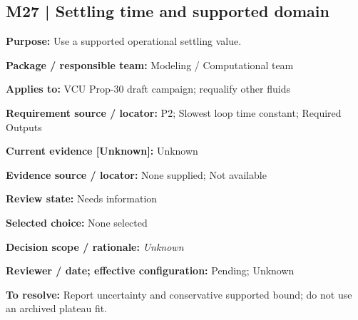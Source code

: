 \documentclass[11pt]{article}
\begin{document}
\par\noindent\begin{minipage}{\textwidth}\small\setlength{\parskip}{2pt}
\subsection*{M27 | Settling time and supported domain}
\textbf{Purpose:} Use a supported operational settling value.\par
\textbf{Package / responsible team:} Modeling / Computational team\par
\textbf{Applies to:} VCU Prop-30 draft campaign; requalify other fluids\par
\textbf{Requirement source / locator:} P2; Slowest loop time constant; Required Outputs\par
\textbf{Current evidence [Unknown]:} Unknown\par
\textbf{Evidence source / locator:} None supplied; Not available\par
\textbf{Review state:} Needs information\par
\textbf{Selected choice:} None selected\par
\textbf{Decision scope / rationale:} \textit{Unknown}\par
\textbf{Reviewer / date; effective configuration:} Pending; Unknown\par
\textbf{To resolve:} Report uncertainty and conservative supported bound; do not use an archived plateau fit.\par
\end{minipage}\par\vspace{5pt}
\end{document}
